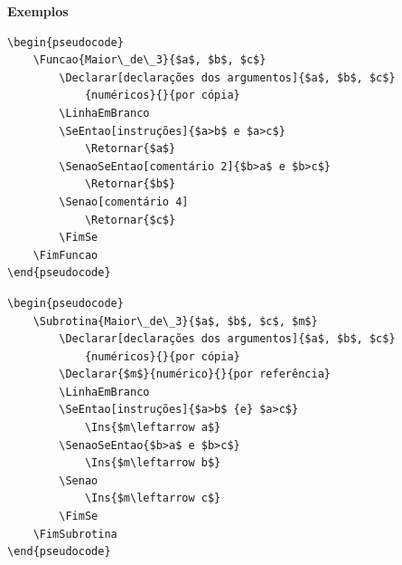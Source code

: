 \documentclass[a4paper,12pt,oneside,onecolumn,final,fleqn]{repUERJ}
\begin{document}
\noindent\textbf{Exemplos}

\begin{verbatim}
\begin{pseudocode}
    \Funcao{Maior\_de\_3}{$a$, $b$, $c$}
        \Declarar[declarações dos argumentos]{$a$, $b$, $c$}
            {numéricos}{}{por cópia}
        \LinhaEmBranco
        \SeEntao[instruções]{$a>b$ e $a>c$}
            \Retornar{$a$}
        \SenaoSeEntao[comentário 2]{$b>a$ e $b>c$}
            \Retornar{$b$}
        \Senao[comentário 4]
            \Retornar{$c$}
        \FimSe
    \FimFuncao
\end{pseudocode}
\end{verbatim}

\noindent{}

\begin{verbatim}
\begin{pseudocode}
    \Subrotina{Maior\_de\_3}{$a$, $b$, $c$, $m$}
        \Declarar[declarações dos argumentos]{$a$, $b$, $c$}
            {numéricos}{}{por cópia}
        \Declarar{$m$}{numérico}{}{por referência}
        \LinhaEmBranco
        \SeEntao[instruções]{$a>b$ {e} $a>c$}
            \Ins{$m\leftarrow a$}
        \SenaoSeEntao{$b>a$ e $b>c$}
            \Ins{$m\leftarrow b$}
        \Senao
            \Ins{$m\leftarrow c$}
        \FimSe
    \FimSubrotina
\end{pseudocode}
\end{verbatim}

\noindent{}
\end{document}
